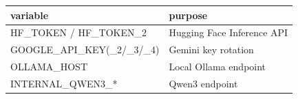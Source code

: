 \begin{tabular}{ll}
\toprule
variable & purpose \\
\midrule
HF\_TOKEN / HF\_TOKEN\_2 & Hugging Face Inference API \\
GOOGLE\_API\_KEY(\_2/\_3/\_4) & Gemini key rotation \\
OLLAMA\_HOST & Local Ollama endpoint \\
INTERNAL\_QWEN3\_* & Qwen3 endpoint \\
\bottomrule
\end{tabular}
